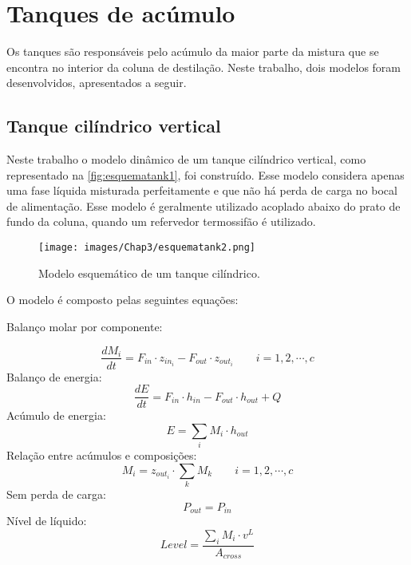 \section{Tanques de acúmulo}
Os tanques são responsáveis pelo acúmulo da maior parte da mistura que
se encontra no interior da coluna de destilação.
Neste trabalho, dois modelos foram desenvolvidos, apresentados a seguir.

\subsection{Tanque cilíndrico vertical} \label{sec:modelotanquecilindrico}
Neste trabalho o modelo dinâmico de um tanque cilíndrico vertical, como
representado na \autoref{fig:esquematank1}, foi construído.
Esse modelo considera apenas uma fase líquida misturada perfeitamente e que não
há perda de carga no bocal de alimentação.
Esse modelo é geralmente utilizado acoplado abaixo do prato de fundo da coluna, quando um refervedor termossifão é utilizado.

\begin{figure}[htb]
\centering \texttt{[image: images/Chap3/esquematank2.png]}
\caption{Modelo esquemático de um tanque cilíndrico.}
\label{fig:esquematank1}
\end{figure}
O modelo é composto pelas seguintes equações:

\begin{flushleft}
Balanço molar por componente:
\end{flushleft}
\begin{equation}
\dfrac{dM_i}{dt} = F_{in} \cdot z_{in_i} - F_{out}  \cdot z_{out_i} \qquad i=1,2,\cdots,c
\end{equation}
Balanço de energia:
\begin{equation}
\dfrac{dE}{dt} = F_{in} \cdot h_{in} - F_{out}  \cdot h_{out} + Q
\end{equation}
Acúmulo de energia:
\begin{equation}
E = \sum_i M_i \cdot h_{out}
\end{equation}
Relação entre acúmulos e composições:
\begin{equation}
M_i = z_{out_i} \cdot \sum_k M_k \qquad i=1,2,\cdots,c
\end{equation}
Sem perda de carga:
\begin{equation}
P_{out} = P_{in}
\end{equation}
Nível de líquido:
\begin{equation}
Level = \dfrac{\sum_i M_i \cdot v^L}{A_{cross}}
\end{equation}

